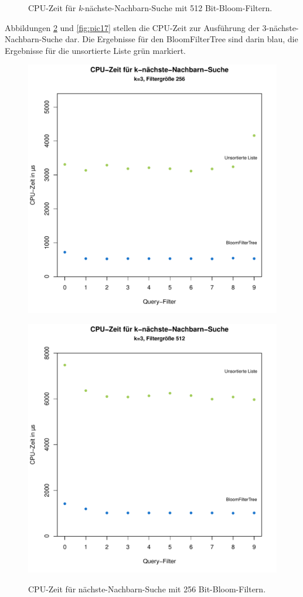 \begin{figure}[hptb]
	\caption[CPU-Zeit für nächste-Nachbarn-Suche mit 512 Bit-Bloom-Filtern]{CPU-Zeit für \textit{k}-nächste-Nachbarn-Suche mit 512 Bit-Bloom-Filtern.}\label{fig:pic15}
\end{figure}

Abbildungen \ref{fig:pic16} und \ref{fig:pic17} stellen die CPU-Zeit zur Ausführung der 3-nächste-Nachbarn-Suche dar. Die Ergebnisse für den BloomFilterTree sind darin blau, die Ergebnisse für die unsortierte Liste grün markiert.  
\begin{figure}[hptb]
	\centering
	\includegraphics[scale=0.7]{pictures/cputime_nn3_256.pdf}\\
	\caption[CPU-Zeit für 3-nächste-Nachbarn-Suche mit 256 Bit-Bloom-Filtern]{CPU-Zeit für nächste-Nachbarn-Suche mit 256 Bit-Bloom-Filtern.}\label{fig:pic16}
	\includegraphics[scale=0.7]{pictures/cputime_nn3_512.pdf}\\

\end{figure}
